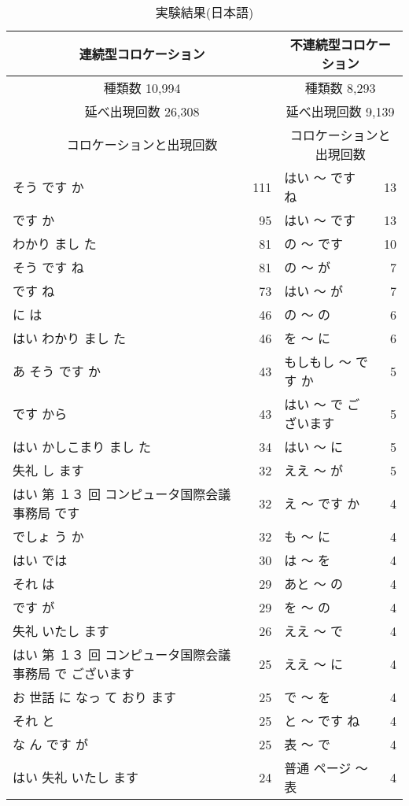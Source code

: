 \begin{table}[hbt]
\begin{center}
\caption{実験結果(日本語)}
\label{Tab:jcolalphaht209}
\begin{footnotesize}
\begin{tabular}{|lr||lr|}
\hline
\multicolumn{2}{|c||}{連続型コロケーション} & \multicolumn{2}{c|}{不連続型コロケーション}\\
\hline
\multicolumn{2}{|c||}{種類数 10,994} & \multicolumn{2}{c|}{種類数 8,293}\\
\hline
\multicolumn{2}{|c||}{延べ出現回数 26,308} & \multicolumn{2}{c|}{延べ出現回数 9,139}\\
\hline
\multicolumn{2}{|c||}{コロケーションと出現回数} & \multicolumn{2}{c|}{コロケーションと出現回数}\\
\hline
そう です か & 111 & はい 〜 です ね & 13\\
です か & 95 & はい 〜 です & 13\\
わかり まし た & 81 & の 〜 です & 10\\
そう です ね & 81 & の 〜 が & 7\\
です ね & 73 & はい 〜 が & 7\\
に は & 46 & の 〜 の & 6\\
はい わかり まし た & 46 & を 〜 に & 6\\
あ そう です か & 43 & もしもし 〜 です か & 5\\
です から & 43 & はい 〜 で ございます & 5\\
はい かしこまり まし た & 34 & はい 〜 に & 5\\
失礼 し ます & 32 & ええ 〜 が & 5\\
はい 第 １３ 回 コンピュータ国際会議事務局 です & 32 & え 〜 です か & 4\\
でしょ う か & 32 & も 〜 に & 4\\
はい では & 30 & は 〜 を & 4\\
それ は & 29 & あと 〜 の & 4\\
です が & 29 & を 〜 の & 4\\
失礼 いたし ます & 26 & ええ 〜 で & 4\\
はい 第 １３ 回 コンピュータ国際会議事務局 で ございます & 25 & ええ 〜 に & 4\\
お 世話 に なっ て おり ます & 25 & で 〜 を & 4\\
それ と & 25 & と 〜 です ね & 4\\
な ん です が & 25 & 表 〜 で & 4\\
はい 失礼 いたし ます & 24 & 普通 ページ 〜 表 & 4\\

\end{tabular}
\end{footnotesize}
\end{center}
\end{table}

